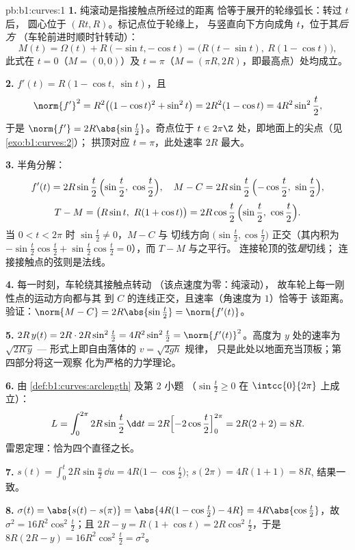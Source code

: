 \begin{solution}{pb:b1:curves:1}
\textbf{1.} 纯滚动是指接触点所经过的距离
恰等于展开的轮缘弧长：转过 $t$ 后，
圆心位于 $(Rt, R)$。标记点位于轮缘上，
与竖直向下方向成角 $t$，位于其\emph{后方}
（车轮前进时顺时针转动）：
\[
M(t) = \Omega(t) + R(-\sin t, -\cos t)
= \bigl(R(t - \sin t),\ R(1 - \cos t)\bigr),
\]
此式在 $t = 0$（$M = (0,0)$）及 $t = \pi$（$M =
(\pi R, 2R)$，即最高点）处均成立。

\textbf{2.} $f'(t) = R(1 - \cos t,\ \sin t)$，且
\[
\norm{f'}^2 = R^2\bigl((1-\cos t)^2 + \sin^2 t\bigr)
= 2R^2(1 - \cos t) = 4R^2\sin^2\frac t2 ,
\]
于是 $\norm{f'} = 2R\abs{\sin\frac t2}$。奇点位于 $t \in
2\pi\Z$ 处，即地面上的尖点（见\cref{exo:b1:curves:2}）；
拱顶对应 $t = \pi$，此处速率 $2R$ 最大。

\textbf{3.} 半角分解：
\[
f'(t) = 2R\sin\frac t2\,\Bigl(\sin\frac t2,\ \cos\frac t2\Bigr),
\quad
M - C = 2R\sin\frac t2\,\Bigl(-\cos\frac t2,\ \sin\frac t2\Bigr),
\]
\[
T - M = \bigl(R\sin t,\ R(1 + \cos t)\bigr)
= 2R\cos\frac t2\,\Bigl(\sin\frac t2,\ \cos\frac t2\Bigr).
\]
当 $0 < t < 2\pi$ 时 $\sin\frac t2 \neq 0$，$M - C$ 与
切线方向 $\bigl(\sin\frac t2, \cos\frac
t2\bigr)$ 正交（其内积为 $-\sin\frac t2\cos\frac t2 +
\sin\frac t2\cos\frac t2 = 0$），而 $T - M$ 与之平行。
连接轮顶的弦\emph{是}切线；
连接接触点的弦则是法线。

\textbf{4.} 每一时刻，车轮绕其接触点转动
（该点速度为零：纯滚动），
故车轮上每一刚性点的运动方向都与其
到 $C$ 的连线正交，且速率（角速度为 $1$）恰等于
该距离。验证：$\norm{M - C} = 2R\abs{\sin\frac t2} =
\norm{f'(t)}$。

\textbf{5.} $2R\,y(t) = 2R\cdot 2R\sin^2\frac t2 =
4R^2\sin^2\frac t2 = \norm{f'(t)}^2$。高度为 $y$ 处的速率为
$\sqrt{2R\,y}$ --- 形式上即自由落体的 $v = \sqrt{2gh}$ 规律，
只是此处以地面充当顶板；第四部分将这一观察
化为严格的力学理论。

\textbf{6.} 由 \cref{def:b1:curves:arclength} 及第 2 小题
（$\sin\frac t2 \geq 0$ 在 $\intcc{0}{2\pi}$ 上成立）：
\[
L = \int_0^{2\pi} 2R\sin\frac t2\,\dd t
= 2R\Bigl[-2\cos\frac t2\Bigr]_0^{2\pi} = 2R(2 + 2) = 8R .
\]
雷恩定理：恰为四个直径之长。

\textbf{7.} $s(t) = \int_0^t 2R\sin\frac u2\,\dd u =
4R\bigl(1 - \cos\frac t2\bigr)$; $s(2\pi) = 4R(1+1) = 8R$,
结果一致。

\textbf{8.} $\sigma(t) = \abs{s(t) - s(\pi)} = \abs{4R(1 -
\cos\frac t2) - 4R} = 4R\abs{\cos\frac t2}$，故 $\sigma^2 =
16R^2\cos^2\frac t2$；且 $2R - y = R(1 + \cos t) =
2R\cos^2\frac t2$，于是 $8R(2R - y) = 16R^2\cos^2\frac t2 =
\sigma^2$。


\end{solution}
